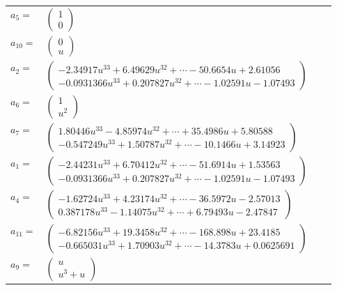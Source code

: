 \documentclass[1p]{elsarticle_modified}
\theoremstyle{definition}
\begin{document}
\begin{tabular}{m{7pt} m{180pt} m{7pt} m{180pt} }
\flushright $a_{5}=$&$\begin{pmatrix}1\\0\end{pmatrix}$ \\
\flushright $a_{10}=$&$\begin{pmatrix}0\\u\end{pmatrix}$ \\
\flushright $a_{2}=$&$\begin{pmatrix}-2.34917 u^{33}+6.49629 u^{32}+\cdots-50.6654 u+2.61056\\-0.0931366 u^{33}+0.207827 u^{32}+\cdots-1.02591 u-1.07493\end{pmatrix}$ \\
\flushright $a_{6}=$&$\begin{pmatrix}1\\u^2\end{pmatrix}$ \\
\flushright $a_{7}=$&$\begin{pmatrix}1.80446 u^{33}-4.85974 u^{32}+\cdots+35.4986 u+5.80588\\-0.547249 u^{33}+1.50787 u^{32}+\cdots-10.1466 u+3.14923\end{pmatrix}$ \\
\flushright $a_{1}=$&$\begin{pmatrix}-2.44231 u^{33}+6.70412 u^{32}+\cdots-51.6914 u+1.53563\\-0.0931366 u^{33}+0.207827 u^{32}+\cdots-1.02591 u-1.07493\end{pmatrix}$ \\
\flushright $a_{4}=$&$\begin{pmatrix}-1.62724 u^{33}+4.23174 u^{32}+\cdots-36.5972 u-2.57013\\0.387178 u^{33}-1.14075 u^{32}+\cdots+6.79493 u-2.47847\end{pmatrix}$ \\
\flushright $a_{11}=$&$\begin{pmatrix}-6.82156 u^{33}+19.3458 u^{32}+\cdots-168.898 u+23.4185\\-0.665031 u^{33}+1.70903 u^{32}+\cdots-14.3783 u+0.0625691\end{pmatrix}$ \\
\flushright $a_{9}=$&$\begin{pmatrix}u\\u^3+u\end{pmatrix}$ \\

\end{tabular}
\end{document}

